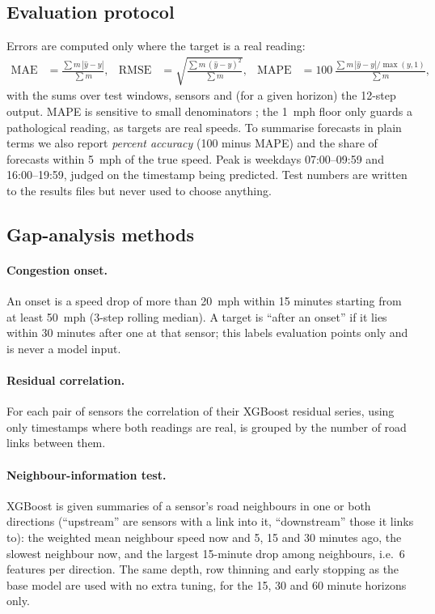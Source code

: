 \documentclass[11pt,a4paper]{article}
\begin{document}
\subsection{Evaluation protocol}
Errors are computed only where the target is a real reading:
\begin{align*}
\mathrm{MAE} &= \frac{\sum m\,|\hat y-y|}{\sum m}, &
\mathrm{RMSE} &= \sqrt{\frac{\sum m\,(\hat y-y)^2}{\sum m}}, &
\mathrm{MAPE} &= 100\,\frac{\sum m\,|\hat y-y|/\max(y,1)}{\sum m},
\end{align*}
with the sums over test windows, sensors and (for a given horizon) the 12-step output.
MAPE is sensitive to small denominators \citep{hyndman2006measures}; the 1~mph floor only guards a pathological reading, as targets are real speeds.
To summarise forecasts in plain terms we also report \emph{percent accuracy} (100 minus MAPE) and the share of forecasts within 5~mph of the true speed.
Peak is weekdays 07:00--09:59 and 16:00--19:59, judged on the timestamp being predicted.
Test numbers are written to the results files but never used to choose anything.

\subsection{Gap-analysis methods}
\paragraph{Congestion onset.}
An onset is a speed drop of more than 20~mph within 15 minutes starting from at least 50~mph (3-step rolling median).
A target is ``after an onset'' if it lies within 30 minutes after one at that sensor; this labels evaluation points only and is never a model input.
\paragraph{Residual correlation.}
For each pair of sensors the correlation of their XGBoost residual series, using only timestamps where both readings are real, is grouped by the number of road links between them.
\paragraph{Neighbour-information test.}
XGBoost is given summaries of a sensor's road neighbours in one or both directions (``upstream'' are sensors with a link into it, ``downstream'' those it links to): the weighted mean neighbour speed now and 5, 15 and 30 minutes ago, the slowest neighbour now, and the largest 15-minute drop among neighbours, i.e.\ 6 features per direction.
The same depth, row thinning and early stopping as the base model are used with no extra tuning, for the 15, 30 and 60 minute horizons only.
\end{document}
